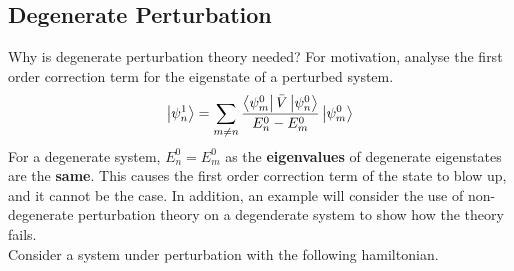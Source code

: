 \documentclass{article}
\begin{document}
\begin{flushleft}
\subsection{Degenerate Perturbation}
Why is degenerate perturbation theory needed? For motivation, analyse the first order correction term for the eigenstate of a perturbed system. 
$$\ket{\psi_n^1}=\sum_{m\neq n}\frac{\bra{\psi_m^0}\bar{V}\ket{\psi_n^0}}{E_n^0-E_m^0}\ket{\psi_m^0}$$
For a degenerate system, $E_n^0=E_m^0$ as the \textbf{eigenvalues} of degenerate eigenstates are the \textbf{same}. This causes the first order correction term of the state to blow up, and it cannot be the case. In addition, an example will consider the use of non-degenerate perturbation theory on a degenderate system to show how the theory fails.\\
Consider a system under perturbation with the following hamiltonian.


\end{flushleft}
\end{document}

